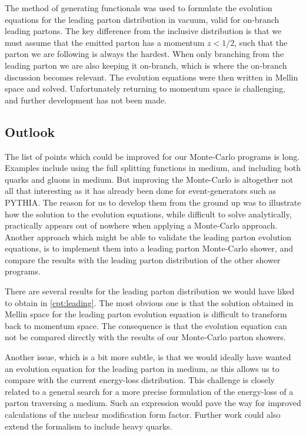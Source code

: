 \documentclass[main.tex]{subfiles}
\begin{document}
The method of generating functionals was used to formulate the evolution equations for the leading parton distribution in vacuum, valid for on-branch leading partons. The key difference from the inclusive distribution is that we must assume that the emitted parton has a momentum \(z<1/2\), such that the parton we are following is always the hardest. When only branching from the leading parton we are also keeping it on-branch, which is where the on-branch discussion becomes relevant. The evolution equations were then written in Mellin space and solved. Unfortunately returning to momentum space is challenging, and further development has not been made. 

\subsection*{Outlook}
The list of points which could be improved for our Monte-Carlo programs is long. Examples include using the full splitting functions in medium, and including both quarks and gluons in medium. But improving the Monte-Carlo is altogether not all that interesting as it has already been done for event-generators such as PYTHIA. The reason for us to develop them from the ground up was to illustrate how the solution to the evolution equations, while difficult to solve analytically, practically appears out of nowhere when applying a Monte-Carlo approach. Another approach which might be able to validate the leading parton evolution equations, is to implement them into a leading parton Monte-Carlo shower, and compare the results with the leading parton distribution of the other shower programs.

There are several results for the leading parton distribution we would have liked to obtain in \autoref{cpt:leading}. The most obvious one is that the solution obtained in Mellin space for the leading parton evolution equation is difficult to transform back to momentum space. The consequence is that the evolution equation can not be compared directly with the results of our Monte-Carlo parton showers. 

Another issue, which is a bit more subtle, is that we would ideally have wanted an evolution equation for the leading parton in medium, as this allows us to compare with the current energy-loss distribution. This challenge is closely related to a general search for a more precise formulation of the energy-loss of a parton traversing a medium. Such an expression would pave the way for improved calculations of the nuclear modification form factor. Further work could also extend the formalism to include heavy quarks. 
\end{document}
